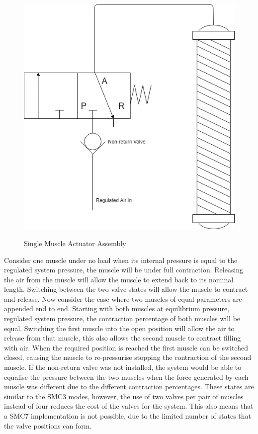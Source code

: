 \documentclass[11pt,a4paper]{article}
\begin{document}
\begin{figure}[hbt!]
    \centering
    \caption{Single Muscle Actuator Assembly}
    \includegraphics[scale=0.3]{Pneumatic_Design.png}
    \label{fig:pneumatic_valve}
\end{figure}

Consider one muscle under no load when its internal pressure is equal to the regulated system pressure, the muscle will be under full contraction. Releasing the air from the muscle will allow the muscle to extend back to its nominal length. Switching between the two valve states will allow the muscle to contract and release. Now consider the case where two muscles of equal parameters are appended end to end. Starting with both muscles at equilibrium pressure, regulated system pressure, the contraction percentage of both muscles will be equal. Switching the first muscle into the open position will allow the air to release from that muscle, this also allows the second muscle to contract filling with air. When the required position is reached the first muscle can be switched closed, causing the muscle to re-pressurise stopping the contraction of the second muscle. If the non-return valve was not installed, the system would be able to equalise the pressure between the two muscles when the force generated by each muscle was different due to the different contraction percentages. These states are similar to the SMC3 modes, however, the use of two valves per pair of muscles instead of four reduces the cost of the valves for the system. This also means that a SMC7 implementation is not possible, due to the limited number of states that the valve positions can form.
\end{document}
